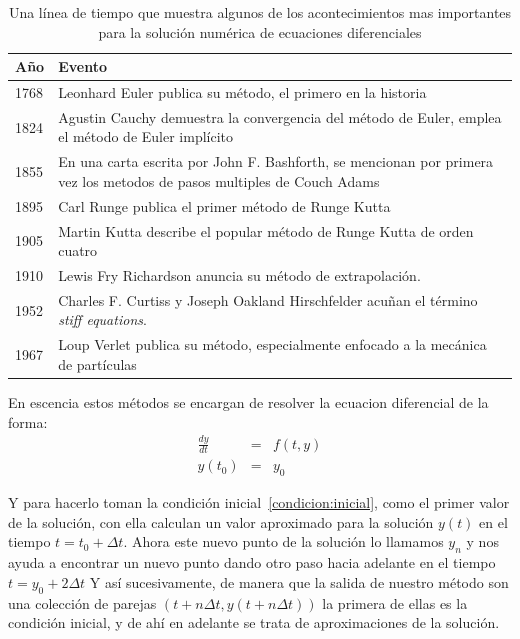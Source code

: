 \begin{table}
\begin{center}
\begin{tabular} {@{}lp{12cm}@{}} 
\toprule
Año & Evento \\ 
\midrule
1768 & Leonhard Euler publica su método, el primero en la historia \\
1824 & Agustin Cauchy demuestra la convergencia del método de Euler, emplea el método de Euler implícito \\
1855 & En una carta escrita por John F. Bashforth, se mencionan por primera vez los metodos de pasos multiples de Couch Adams \\
1895 & Carl Runge publica el primer método de Runge Kutta \\ 
1905 & Martin Kutta describe el popular método de Runge Kutta de orden cuatro \\ 
1910 & Lewis Fry Richardson anuncia su método de extrapolación. \\
1952 & Charles F. Curtiss y Joseph Oakland Hirschfelder acuñan el término \emph{\foreignlanguage{english}{stiff equations}}. \\
1967 & Loup Verlet publica su método, especialmente enfocado a la mecánica de partículas \\ 
\bottomrule
\end{tabular}
\end{center}
\caption[Evolución histórica de los métodos numéricos]{Una línea de tiempo que muestra algunos de los acontecimientos mas importantes para la solución numérica de ecuaciones diferenciales}
\label{historia:metodos}
\end{table}

En escencia estos métodos se encargan de resolver la ecuacion diferencial de la forma:
\begin{eqnarray}
 \frac{dy}{dt} & = &f(t,y) \nonumber \\
 y(t_0) & = & y_0 \label{condicion:inicial}
\end{eqnarray}

Y para hacerlo toman la condición inicial~\ref{condicion:inicial}, como el primer valor de la solución, con ella calculan un valor aproximado para la solución $y(t)$ en el tiempo $t = t_0 + \Delta t$. Ahora este nuevo punto de la solución lo llamamos $y_{n}$ y nos ayuda a encontrar un nuevo punto dando otro paso hacia adelante en el tiempo $t = y_0 + 2\Delta t$
Y así sucesivamente, de manera que la salida de nuestro método son una colección de parejas $(t + n \Delta t, y(t + n \Delta t) )$ la primera de ellas es la condición inicial, y de ahí en adelante se trata de aproximaciones de la solución.

